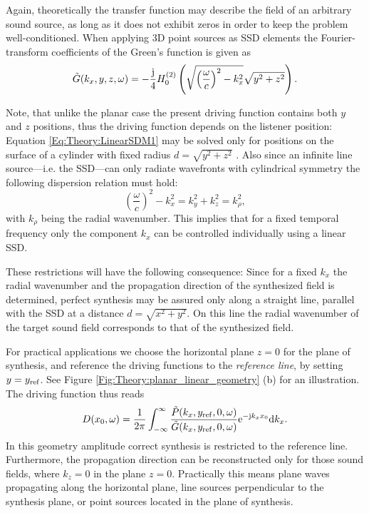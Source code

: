 Again, theoretically the transfer function may describe the field of an arbitrary sound source, as long as it does not exhibit zeros in order to keep the problem well-conditioned.
When applying 3D point sources as SSD elements the Fourier-transform coefficients of the Green's function is given as \cite{Ahrens2010a}
\begin{equation}
\tilde{G}(k_x,y,z,\omega) = -\frac{\mathrm{j}}{4} H_0^{(2)}\left( \sqrt{ \left( \frac{\omega}{c} \right)^2 - k_x^2 } \sqrt{ y^2 + z^2 } \right).
\end{equation}

\vspace{3mm}
Note, that unlike the planar case the present driving function contains both $y$ and $z$ positions, thus the driving function depends on the listener position: Equation \eqref{Eq:Theory:LinearSDM1} may be solved only for positions on the surface of a cylinder with fixed radius $d = \sqrt{y^2 + z^2}$ \cite[p.~60.]{Ahrens2010phd}.
Also since an infinite line source---i.e. the SSD---can only radiate wavefronts with cylindrical symmetry the following  dispersion relation must hold:
%
\begin{equation}
\left( \frac{\omega} {c}\right)^2 - k_x^2 = k_y^2 + k_z^2 = k_{\rho}^2,
\end{equation}
%
with $k_{\rho}$ being the radial wavenumber. This implies that for a fixed temporal frequency only the component $k_x$ can be controlled individually using a linear SSD.

These restrictions will have the following consequence:
Since for a fixed $k_x$ the radial wavenumber and the propagation direction of the synthesized field is determined, perfect synthesis may be assured only along a straight line, parallel with the SSD at a distance $d = \sqrt{x^2 + y^2}$.
On this line the radial wavenumber of the target sound field corresponds to that of the synthesized field.

For practical applications we choose the horizontal plane $z=0$ for the plane of synthesis, and reference the driving functions to the \emph{reference line}, by setting $y = y_{\mathrm{ref}}$.
See Figure \ref{Fig:Theory:planar_linear_geometry} (b) for an illustration. The driving function thus reads
\begin{equation}
D(x_0,\omega) = \frac{1}{2\pi} \int_{-\infty}^{\infty} \frac{\tilde{P}(k_x,y_{\mathrm{ref}},0, \omega) }{\tilde{G}(k_x,y_{\mathrm{ref}},0, \omega)} \mathrm{e}^{-\mathrm{j} k_x x_0} \mathrm{d} k_x.
\label{Eq:Theory:Linear_SDM}
\end{equation}
In this geometry amplitude correct synthesis is restricted to the reference line.
Furthermore, the propagation direction can be reconstructed only for those sound fields, where $k_z = 0$ in the plane $z=0$. Practically this means plane waves propagating along the horizontal plane, line sources perpendicular to the synthesis plane, or point sources located in the plane of synthesis.

